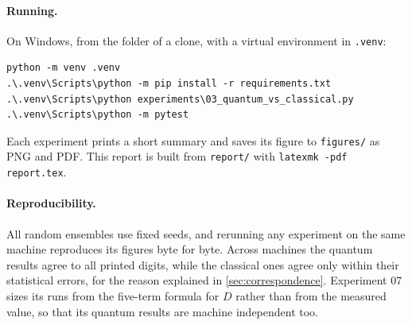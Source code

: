 \paragraph{Running.}
On Windows, from the folder of a clone, with a virtual environment in \texttt{.venv}:
\begin{verbatim}
python -m venv .venv
.\.venv\Scripts\python -m pip install -r requirements.txt
.\.venv\Scripts\python experiments\03_quantum_vs_classical.py
.\.venv\Scripts\python -m pytest
\end{verbatim}
Each experiment prints a short summary and saves its figure to \texttt{figures/} as PNG and PDF. This report
is built from \texttt{report/} with \texttt{latexmk -pdf report.tex}.

\paragraph{Reproducibility.}
All random ensembles use fixed seeds, and rerunning any experiment on the same machine reproduces its figures
byte for byte. Across machines the quantum results agree to all printed digits, while the classical ones agree
only within their statistical errors, for the reason explained in \cref{sec:correspondence}. Experiment 07
sizes its runs from the five-term formula for $D$ rather than from the measured value, so that its quantum
results are machine independent too.
